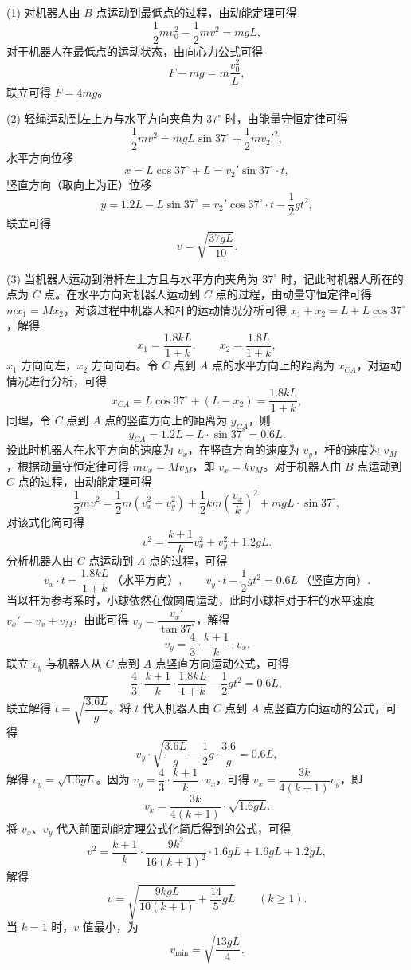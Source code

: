 \begin{answer}
(1) 对机器人由 $B$ 点运动到最低点的过程，由动能定理可得
\[
  \frac{1}{2}mv_{0}^{2}-\frac{1}{2}mv^{2}=mgL,
\]
对于机器人在最低点的运动状态，由向心力公式可得
\[
  F-mg=m\frac{v_{0}^{2}}{L},
\]
联立可得 $F=4mg$。

(2) 轻绳运动到左上方与水平方向夹角为 $37^{\circ}$ 时，由能量守恒定律可得
\[
  \frac{1}{2}mv^{2}=mgL\sin37^{\circ}+\frac{1}{2}mv_{2}'^{2},
\]
水平方向位移
\[
  x=L\cos37^{\circ}+L=v_{2}'\sin37^{\circ}\cdot t,
\]
竖直方向（取向上为正）位移
\[
  y=1.2L-L\sin37^{\circ}=v_{2}'\cos37^{\circ}\cdot t-\frac{1}{2}gt^{2},
\]
联立可得
\[
  v=\sqrt{\frac{37gL}{10}}.
\]

(3) 当机器人运动到滑杆左上方且与水平方向夹角为 $37^{\circ}$ 时，记此时机器人所在的点为 $C$ 点。在水平方向对机器人运动到 $C$ 点的过程，由动量守恒定律可得 $mx_{1}=Mx_{2}$，对该过程中机器人和杆的运动情况分析可得 $x_{1}+x_{2}=L+L\cos37^{\circ}$，解得
\[
  x_{1}=\frac{1.8kL}{1+k},\qquad x_{2}=\frac{1.8L}{1+k},
\]
$x_{1}$ 方向向左，$x_{2}$ 方向向右。令 $C$ 点到 $A$ 点的水平方向上的距离为 $x_{CA}$，对运动情况进行分析，可得
\[
  x_{CA}=L\cos37^{\circ}+(L-x_{2})=\frac{1.8kL}{1+k},
\]
同理，令 $C$ 点到 $A$ 点的竖直方向上的距离为 $y_{CA}$，则
\[
  y_{CA}=1.2L-L\cdot\sin37^{\circ}=0.6L.
\]
设此时机器人在水平方向的速度为 $v_{x}$，在竖直方向的速度为 $v_{y}$，杆的速度为 $v_{M}$，根据动量守恒定律可得 $mv_{x}=Mv_{M}$，即 $v_{x}=kv_{M}$。对于机器人由 $B$ 点运动到 $C$ 点的过程，由动能定理可得
\[
  \frac{1}{2}mv^{2}=\frac{1}{2}m(v_{x}^{2}+v_{y}^{2})
                  +\frac{1}{2}km\left(\frac{v_{x}}{k}\right)^{2}
                  +mgL\cdot\sin37^{\circ},
\]
对该式化简可得
\[
  v^{2}=\frac{k+1}{k}v_{x}^{2}+v_{y}^{2}+1.2gL.
\]
分析机器人由 $C$ 点运动到 $A$ 点的过程，可得
\[
  v_{x}\cdot t=\frac{1.8kL}{1+k}\ \text{（水平方向）},\qquad
  v_{y}\cdot t-\frac{1}{2}gt^{2}=0.6L\ \text{（竖直方向）}.
\]
当以杆为参考系时，小球依然在做圆周运动，此时小球相对于杆的水平速度 $v_{x}'=v_{x}+v_{M}$，由此可得 $v_{y}=\dfrac{v_{x}'}{\tan37^{\circ}}$，解得
\[
  v_{y}=\frac{4}{3}\cdot\frac{k+1}{k}\cdot v_{x}.
\]
联立 $v_{y}$ 与机器人从 $C$ 点到 $A$ 点竖直方向运动公式，可得
\[
  \frac{4}{3}\cdot\frac{k+1}{k}\cdot\frac{1.8kL}{1+k}-\frac{1}{2}gt^{2}=0.6L,
\]
联立解得 $t=\sqrt{\dfrac{3.6L}{g}}$。将 $t$ 代入机器人由 $C$ 点到 $A$ 点竖直方向运动的公式，可得
\[
  v_{y}\cdot\sqrt{\frac{3.6L}{g}}-\frac{1}{2}g\cdot\frac{3.6}{g}=0.6L,
\]
解得 $v_{y}=\sqrt{1.6gL}$。因为 $v_{y}=\dfrac{4}{3}\cdot\dfrac{k+1}{k}\cdot v_{x}$，可得 $v_{x}=\dfrac{3k}{4(k+1)}v_{y}$，即
\[
  v_{x}=\frac{3k}{4(k+1)}\cdot\sqrt{1.6gL}.
\]
将 $v_{x}$、$v_{y}$ 代入前面动能定理公式化简后得到的公式，可得
\[
  v^{2}=\frac{k+1}{k}\cdot\frac{9k^{2}}{16(k+1)^{2}}\cdot1.6gL
       +1.6gL+1.2gL,
\]
解得
\[
  v=\sqrt{\frac{9kgL}{10(k+1)}+\frac{14}{5}gL}\qquad(k\ge1).
\]
当 $k=1$ 时，$v$ 值最小，为
\[
  v_{\min}=\sqrt{\frac{13gL}{4}}.
\]
\end{answer}

